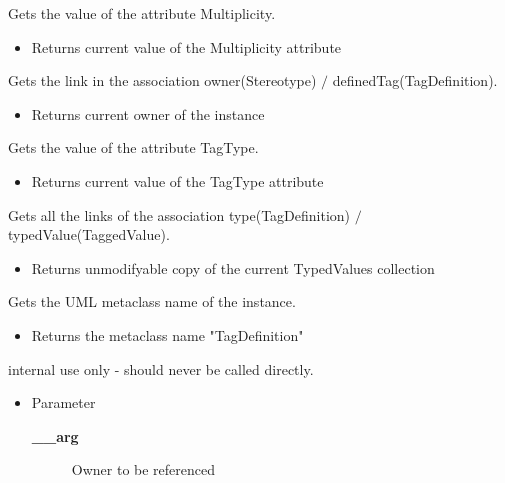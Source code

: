 \begin{desc}Gets the value of the attribute Multiplicity.
\begin{itemize}
\item{Returns current value of the Multiplicity attribute }
\end{itemize}
\end{desc}

\begin{desc}Gets the link in the association owner(Stereotype)
 $/$ definedTag(TagDefinition).
\begin{itemize}
\item{Returns current owner of the instance }
\end{itemize}
\end{desc}

\begin{desc}Gets the value of the attribute TagType.
\begin{itemize}
\item{Returns current value of the TagType attribute }
\end{itemize}
\end{desc}

\begin{desc}Gets all the links of the association type(TagDefinition)
 $/$ typedValue(TaggedValue).
\begin{itemize}
\item{Returns unmodifyable copy of the current TypedValues collection }
\end{itemize}
\end{desc}

\begin{desc}Gets the UML metaclass name of the instance.
\begin{itemize}
\item{Returns the metaclass name "TagDefinition" }
\end{itemize}
\end{desc}

\begin{desc}internal use only - should never be called directly.
\begin{itemize}
\item{Parameter
  \begin{description}
   \item[{\bf \_\_arg}]{Owner to be referenced}
  \end{description}}
\end{itemize}
\end{desc}


